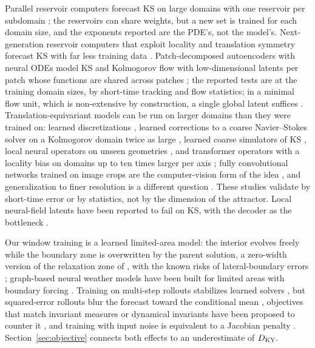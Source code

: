  Parallel reservoir computers
forecast KS on large domains with one reservoir per subdomain
\citep{pathak2018}; the reservoirs can share weights, but a new set is
trained for each domain size, and the exponents reported are the PDE's,
not the model's. Next-generation reservoir computers that exploit
locality and translation symmetry forecast KS with far less training
data \citep{barbosa2022}. Patch-decomposed autoencoders with neural ODEs
model KS and Kolmogorov flow with low-dimensional latents per patch whose
functions are shared across patches \citep{constanteamores2024}; the
reported tests are at the training domain sizes, by short-time tracking
and flow statistics; in a minimal flow unit, which is
non-extensive by construction, a single global latent suffices
\citep{constanteamores2025}. Translation-equivariant models can be run on
larger domains than they were trained on: learned discretizations
\citep{barsinai2019}, learned corrections to a coarse Navier--Stokes
solver on a Kolmogorov domain twice as large \citep{kochkov2021}, learned
coarse simulators of KS \citep{stachenfeld2022}, local neural operators on
unseen geometries \citep{li2024lno}, and transformer operators with a
locality bias on domains up to ten times larger per axis
\citep{devilleroche2026}; fully convolutional networks trained on image
crops are the computer-vision form of the idea \citep{long2015}, and
generalization to finer resolution is a different question
\citep{sakarvadia2026}. These studies validate by short-time error or by
statistics, not by the dimension of the attractor. Local neural-field
latents have been reported to fail on KS, with the decoder as the
bottleneck \citep{aroma2024}.

 Our window training is a
learned limited-area model: the interior evolves freely while the
boundary zone is overwritten by the parent solution, a zero-width version
of the relaxation zone of \citet{davies1976}, with the known risks of
lateral-boundary errors \citep{warner1997}; graph-based neural weather
models have been built for limited areas with boundary forcing
\citep{oskarsson2023}. Training on multi-step rollouts stabilizes learned
solvers \citep{brandstetter2022,lippe2023}, but squared-error rollouts
blur the forecast toward the conditional mean
\citep{lam2023graphcast,bonavita2024}, objectives that match invariant
measures or dynamical invariants have been proposed to counter it
\citep{jiang2023,schiff2024,platt2023}, and training with input noise is
equivalent to a Jacobian penalty \citep{bishop1995}.
Section~\ref{sec:objective} connects both effects to an underestimate of
$D_{\mathrm{KY}}$.

